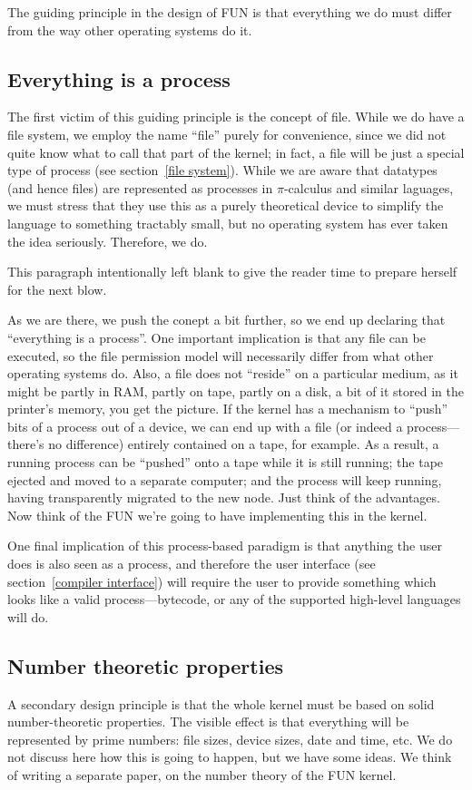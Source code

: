 \documentclass[12pt,titlepage,a4paper,twoside]{article}
\begin{document}
The guiding principle in the design of FUN is that everything we do
must differ from the way other operating systems do it.

\subsection{Everything is a process}
\label{overall design philosophy:everything is a process}
The first victim of this guiding principle is the concept of file. While
we do have a file system, we employ the name ``file'' purely for convenience,
since we did not quite know what to call that part of the kernel; in fact,
a file will be just a special type of process (see section~\ref{file system}).
While we are aware that datatypes (and hence files) are represented as
processes in $\pi$-calculus and similar laguages, we must stress that they use
this as a purely theoretical device to simplify the language to something
tractably small, but no operating system has ever taken the idea seriously.
Therefore, we do.

This paragraph intentionally left blank to give the reader time to prepare
herself for the next blow.

As we are there, we push the conept a bit further, so we
end up declaring that ``everything is a process''. One important
implication is that any file can be executed, so the file permission model
will necessarily differ from what other operating systems do. Also, a file
does not ``reside'' on a particular medium, as it might be partly in RAM,
partly on tape, partly on a disk, a bit of it stored in the printer's
memory, you get the picture. If the kernel has a mechanism to ``push''
bits of a process out of a device, we can end up with a file (or indeed
a process---there's no difference) entirely contained on a tape, for
example. As a result, a running process can be ``pushed'' onto a tape
while it is still running; the tape ejected and moved to a separate
computer; and the process will keep running, having transparently migrated
to the new node. Just think of the advantages. Now think of the FUN we're
going to have implementing this in the kernel.

One final implication of this process-based paradigm is that anything the
user does is also seen as a process, and therefore the user interface (see
section~\ref{compiler interface}) will require the user to provide something
which looks like a valid process---bytecode, or any of the supported high-level
languages will do.

\subsection{Number theoretic properties}
\label{overall design philosophy:number theoretic properties}
A secondary design principle is that the whole kernel must be based on solid
number-theoretic properties. The visible effect is that everything will be
represented by prime numbers: file sizes, device sizes, date and time, etc.
We do not discuss here how this is going to happen, but we have some ideas.
We think of writing a separate paper, on the number theory of the FUN
kernel.
\end{document}
